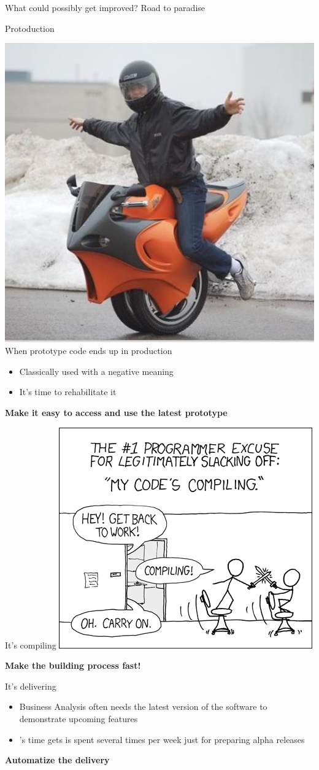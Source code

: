 \documentclass[presentation]{beamer}
\begin{document}
\begin{frame}{What could possibly get improved? Road to paradise}
	\begin{block}{Protoduction \cite{jargon}}
		\begin{center}
			\includegraphics[width=.25\textwidth]{images/protoduction} \\
			When prototype code ends up in production
		\end{center}
		\begin{itemize}
			\item Classically used with a negative meaning
			\item It's time to rehabilitate it
		\end{itemize}
		\textbf{Make it easy to access and use the latest prototype}
	\end{block}
	\begin{block}{It's compiling \cite{xkcd303}}
		\centering
		\includegraphics[width=.49\textwidth]{images/compiling}

		\textbf{Make the building process fast!}
	\end{block}
	\begin{block}{It's delivering}
		\begin{itemize}
			\item Business Analysis often needs the latest version of the software to demonstrate upcoming features
			\item \baddev{}'s time gets is spent several times per week just for preparing alpha releases
		\end{itemize}
		\textbf{Automatize the delivery}
	\end{block}
\end{frame}
\end{document}
